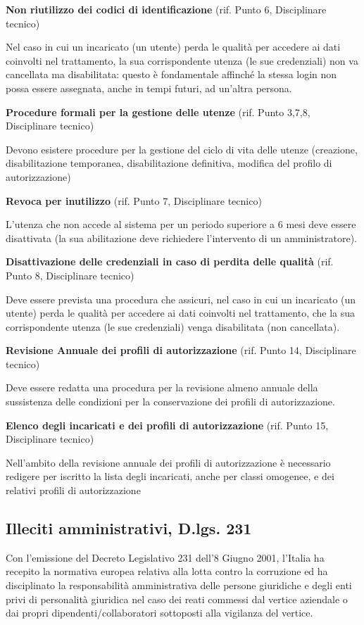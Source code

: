 \textbf{Non riutilizzo dei codici di identificazione} (rif. Punto 6, Disciplinare tecnico)

Nel caso in cui un incaricato (un utente) perda le qualit\`a per
accedere ai dati coinvolti nel trattamento, la sua corrispondente
utenza (le sue credenziali) non va cancellata ma disabilitata: questo
\`e fondamentale affinch\'e la stessa login non possa essere assegnata,
anche in tempi futuri, ad un'altra persona.


\textbf{Procedure formali per la gestione delle utenze} (rif. Punto 3,7,8, Disciplinare tecnico)

Devono esistere procedure per la gestione del ciclo di vita delle utenze
(creazione, disabilitazione temporanea, disabilitazione definitiva,
modifica del profilo di autorizzazione)


\textbf{Revoca per inutilizzo} (rif. Punto 7, Disciplinare tecnico)

L'utenza che non accede al sistema per un periodo
superiore a 6 mesi deve essere disattivata (la sua abilitazione deve
richiedere l'intervento di un amministratore).


\textbf{Disattivazione delle credenziali in caso di perdita delle qualit\`a}
(rif. Punto 8, Disciplinare tecnico)

Deve essere prevista una procedura che assicuri, nel caso in cui un
incaricato (un utente) perda le qualit\`a per accedere ai dati
coinvolti nel trattamento, che la sua corrispondente utenza (le sue
credenziali) venga disabilitata (non cancellata).


\textbf{Revisione Annuale dei profili di autorizzazione} (rif. Punto 14,
Disciplinare tecnico)

Deve essere redatta una procedura per la revisione almeno annuale della
sussistenza delle condizioni per la conservazione dei profili di
autorizzazione.


\textbf{Elenco degli incaricati e dei profili di autorizzazione}
(rif. Punto 15, Disciplinare tecnico)

Nell'ambito della revisione annuale dei profili di
autorizzazione \`e necessario redigere per iscritto la lista degli
incaricati, anche per classi omogenee, e dei relativi profili di
autorizzazione


\subsection{Illeciti amministrativi, D.lgs. 231}

Con l'emissione del Decreto Legislativo 231 dell'8 Giugno 2001, l'Italia ha
recepito la normativa europea relativa alla lotta contro la corruzione ed ha
disciplinato la responsabilit\`a amministrativa delle persone giuridiche e degli
enti privi di personalit\`a giuridica nel caso dei reati commessi dal vertice
aziendale o dai propri dipendenti/collaboratori sottoposti alla vigilanza del
vertice.

